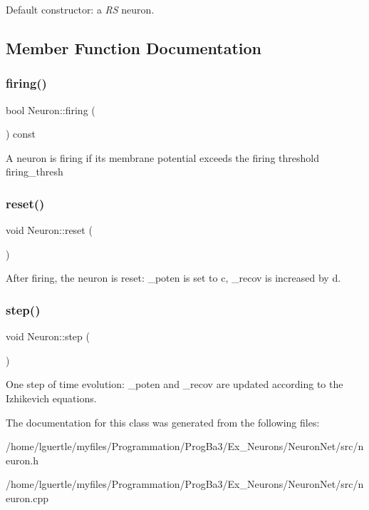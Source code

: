 Default constructor\+: a {\itshape RS} neuron. 

\subsection{Member Function Documentation}
\mbox{\label{classNeuron_a4f477ebb623a7681c0f09dbfc4608a0d}} 
\subsubsection{\texorpdfstring{firing()}{firing()}}
{\footnotesize\ttfamily bool Neuron\+::firing (\begin{DoxyParamCaption}{ }\end{DoxyParamCaption}) const\hspace{0.3cm}{\ttfamily [inline]}}

A neuron is firing if its membrane potential exceeds the firing threshold firing\+\_\+thresh \mbox{\label{classNeuron_a6817fc5bf2128150b41b65e74f018408}} 
\subsubsection{\texorpdfstring{reset()}{reset()}}
{\footnotesize\ttfamily void Neuron\+::reset (\begin{DoxyParamCaption}{ }\end{DoxyParamCaption})\hspace{0.3cm}{\ttfamily [inline]}}

After firing, the neuron is reset\+: \+\_\+poten is set to {\ttfamily c}, \+\_\+recov is increased by {\ttfamily d}. \mbox{\label{classNeuron_a224d5cead5f94bbe15ae49774db3e174}} 
\subsubsection{\texorpdfstring{step()}{step()}}
{\footnotesize\ttfamily void Neuron\+::step (\begin{DoxyParamCaption}{ }\end{DoxyParamCaption})}

One step of time evolution\+: \+\_\+poten and \+\_\+recov are updated according to the Izhikevich equations. 

The documentation for this class was generated from the following files\+:\begin{DoxyCompactItemize}
\item 
/home/lguertle/myfiles/\+Programmation/\+Prog\+Ba3/\+Ex\+\_\+\+Neurons/\+Neuron\+Net/src/neuron.\+h\item 
/home/lguertle/myfiles/\+Programmation/\+Prog\+Ba3/\+Ex\+\_\+\+Neurons/\+Neuron\+Net/src/neuron.\+cpp\end{DoxyCompactItemize}
